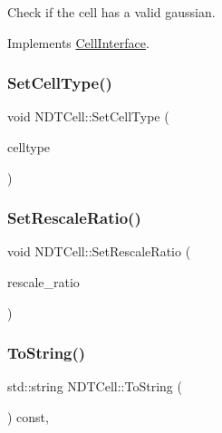 Check if the cell has a valid gaussian. 



Implements \hyperlink{classCellInterface_a4fde95ddb0950dc41ee77dfdeb90928b}{Cell\+Interface}.

\mbox{\label{classNDTCell_a1b01d5830bf808db3809a5a8c2ee7963}} 
\subsubsection{\texorpdfstring{Set\+Cell\+Type()}{SetCellType()}}
{\footnotesize\ttfamily void N\+D\+T\+Cell\+::\+Set\+Cell\+Type (\begin{DoxyParamCaption}\item[{\hyperlink{classNDTCell_abd36cc88f0ef7145a126ed0058ea2f6e}{Cell\+Type}}]{celltype }\end{DoxyParamCaption})\hspace{0.3cm}{\ttfamily [inline]}}

\mbox{\label{classNDTCell_a9a9a49fa06648269a2c6ac68cd335284}} 
\subsubsection{\texorpdfstring{Set\+Rescale\+Ratio()}{SetRescaleRatio()}}
{\footnotesize\ttfamily void N\+D\+T\+Cell\+::\+Set\+Rescale\+Ratio (\begin{DoxyParamCaption}\item[{double}]{rescale\+\_\+ratio }\end{DoxyParamCaption})\hspace{0.3cm}{\ttfamily [inline]}}

\mbox{\label{classNDTCell_ab0243b5d87bfad3884a400681b9c46fa}} 
\subsubsection{\texorpdfstring{To\+String()}{ToString()}}
{\footnotesize\ttfamily std\+::string N\+D\+T\+Cell\+::\+To\+String (\begin{DoxyParamCaption}{ }\end{DoxyParamCaption}) const\hspace{0.3cm}{\ttfamily [override]}, {\ttfamily [virtual]}}



